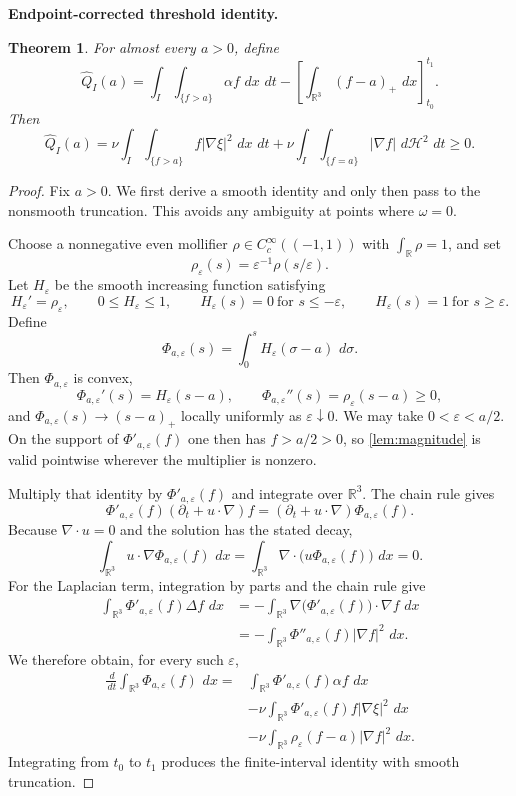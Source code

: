 \documentclass[11pt]{article}
\newtheorem{theorem}{Theorem}[section]
\theoremstyle{definition}\newtheorem{definition}[theorem]{Definition}
\theoremstyle{remark}\newtheorem{remark}[theorem]{Remark}
\newcommand{\R}{\mathbb R}\newcommand{\dd}{\,d}\newcommand{\HH}{\mathcal H}
\newcommand{\Qhat}{\widehat Q}\newcommand{\Qp}{\widehat{\mathfrak Q}}
\begin{document}
\medskip
\noindent\textbf{Endpoint-corrected threshold identity.}
\begin{theorem}\label{thm:threshold}
For almost every $a>0$, define
\[
\Qhat_I(a)=\int_I\int_{\{f>a\}}\alpha f\,\dd x\,\dd t
-\left[\int_{\R^3}(f-a)_+\,\dd x\right]_{t_0}^{t_1}.
\]
Then
\[
\boxed{
\Qhat_I(a)=
\nu\int_I\int_{\{f>a\}}f|\nabla\xi|^2\,\dd x\,\dd t
+\nu\int_I\int_{\{f=a\}}|\nabla f|\,\dd\HH^2\,\dd t\ge0.
}
\]
\end{theorem}
\begin{proof}
Fix $a>0$.  We first derive a smooth identity and only then pass to the
nonsmooth truncation.  This avoids any ambiguity at points where $\omega=0$.

Choose a nonnegative even mollifier $\rho\in C_c^\infty((-1,1))$ with
$\int_\R\rho=1$, and set
\[
\rho_\varepsilon(s)=\varepsilon^{-1}\rho(s/\varepsilon).
\]
Let $H_\varepsilon$ be the smooth increasing function satisfying
\[
H_\varepsilon'=\rho_\varepsilon,
\qquad
0\le H_\varepsilon\le1,
\qquad
H_\varepsilon(s)=0\ \text{for }s\le-\varepsilon,
\qquad
H_\varepsilon(s)=1\ \text{for }s\ge\varepsilon.
\]
Define
\[
\Phi_{a,\varepsilon}(s)=\int_0^sH_\varepsilon(\sigma-a)\,\dd\sigma.
\]
Then $\Phi_{a,\varepsilon}$ is convex,
\[
\Phi_{a,\varepsilon}'(s)=H_\varepsilon(s-a),
\qquad
\Phi_{a,\varepsilon}''(s)=\rho_\varepsilon(s-a)\ge0,
\]
and $\Phi_{a,\varepsilon}(s)\to(s-a)_+$ locally uniformly as
$\varepsilon\downarrow0$.  We may take $0<\varepsilon<a/2$.  On the support
of $\Phi'_{a,\varepsilon}(f)$ one then has $f>a/2>0$, so
\cref{lem:magnitude} is valid pointwise wherever the multiplier is nonzero.

Multiply that identity by $\Phi'_{a,\varepsilon}(f)$ and integrate over
$\R^3$.  The chain rule gives
\[
\Phi'_{a,\varepsilon}(f)(\partial_t+u\cdot\nabla)f
=(\partial_t+u\cdot\nabla)\Phi_{a,\varepsilon}(f).
\]
Because $\nabla\cdot u=0$ and the solution has the stated decay,
\[
\int_{\R^3}u\cdot\nabla\Phi_{a,\varepsilon}(f)\,\dd x
=\int_{\R^3}\nabla\cdot\bigl(u\Phi_{a,\varepsilon}(f)\bigr)\,\dd x=0.
\]
For the Laplacian term, integration by parts and the chain rule give
\[
\begin{aligned}
\int_{\R^3}\Phi'_{a,\varepsilon}(f)\Delta f\,\dd x
&=-\int_{\R^3}\nabla\bigl(\Phi'_{a,\varepsilon}(f)\bigr)\cdot\nabla f\,\dd x\\
&=-\int_{\R^3}\Phi''_{a,\varepsilon}(f)|\nabla f|^2\,\dd x.
\end{aligned}
\]
We therefore obtain, for every such $\varepsilon$,
\begin{equation}\label{eq:smooth-threshold}
\begin{aligned}
\frac{\dd}{\dd t}\int_{\R^3}\Phi_{a,\varepsilon}(f)\,\dd x
={}&\int_{\R^3}\Phi'_{a,\varepsilon}(f)\alpha f\,\dd x\\
&-\nu\int_{\R^3}\Phi'_{a,\varepsilon}(f)f|\nabla\xi|^2\,\dd x\\
&-\nu\int_{\R^3}\rho_\varepsilon(f-a)|\nabla f|^2\,\dd x.
\end{aligned}
\end{equation}
Integrating from $t_0$ to $t_1$ produces the finite-interval identity with
smooth truncation.


\end{proof}
\end{document}
